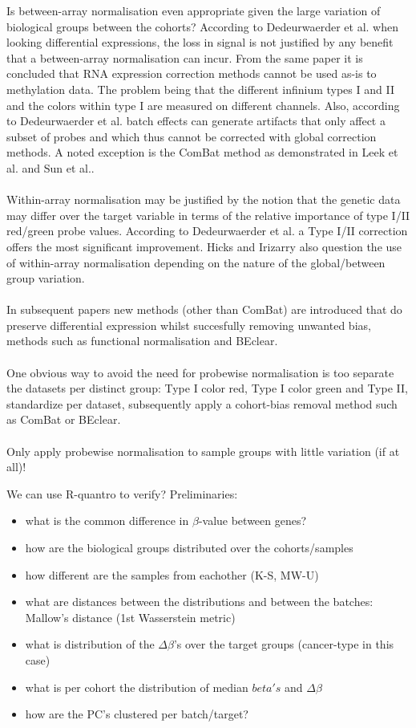\documentclass[a4paper,10pt]{article}
\begin{document}
Is between-array normalisation even appropriate given the large variation of biological groups between the cohorts?
According to Dedeurwaerder et al.\cite{Dedeurwaerder2014} when looking differential expressions, the loss in signal is not justified by any benefit that a between-array normalisation can incur. From the same paper it is concluded
that RNA expression correction methods cannot be used as-is to methylation data. The problem being that the different infinium types I and II and the colors within type I are measured on different channels. Also, according 
to Dedeurwaerder et al. batch effects can generate artifacts that only affect a subset of probes and which thus
cannot be corrected with global correction methods. A noted exception is the ComBat\cite{Johnson2007} method as demonstrated in Leek et al.\cite{Leek2010} and Sun et al.\cite{Sun2011}.
\\ \\
%
Within-array normalisation may be justified by the notion that the genetic data may differ over the target variable in terms of the relative importance of type I/II red/green probe values. According to Dedeurwaerder et al.\cite{Dedeurwaerder2014} a Type I/II correction offers the most significant improvement. Hicks and Irizarry\cite{Hicks2014} also question the use of within-array
normalisation depending on the nature of the global/between group variation.\\ \\
%
In subsequent papers new methods (other than ComBat) are introduced that do preserve differential expression whilst succesfully removing unwanted bias, methods such as functional normalisation and BEclear. \\ \\
%
One obvious way to avoid the need for probewise normalisation is too separate the datasets per distinct group:
Type I color red, Type I color green and Type II, standardize per dataset, subsequently apply a cohort-bias removal method such as ComBat or BEclear. \\ \\
%
Only apply probewise normalisation to sample groups with little variation (if at all)!

We can use R-quantro to verify?
%
Preliminaries:
\begin{itemize}
 \item what is the common difference in $\beta$-value between genes?
 \item how are the biological groups distributed over the cohorts/samples
 \item how different are the samples from eachother (K-S, MW-U)
 \item what are distances between the distributions and between the batches: Mallow’s distance (1st Wasserstein metric)
 \item what is distribution of the $\Delta \beta$'s over the target groups (cancer-type in this case)
 \item what is per cohort the distribution of median $beta's$ and $\Delta \beta$
 \item how are the PC's clustered per batch/target?
\end{itemize}
%
\end{document}
